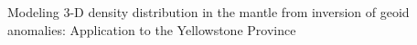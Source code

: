 

Modeling 3-D density distribution in the mantle from inversion
of geoid anomalies: Application to the Yellowstone Province \cite{chus13}
